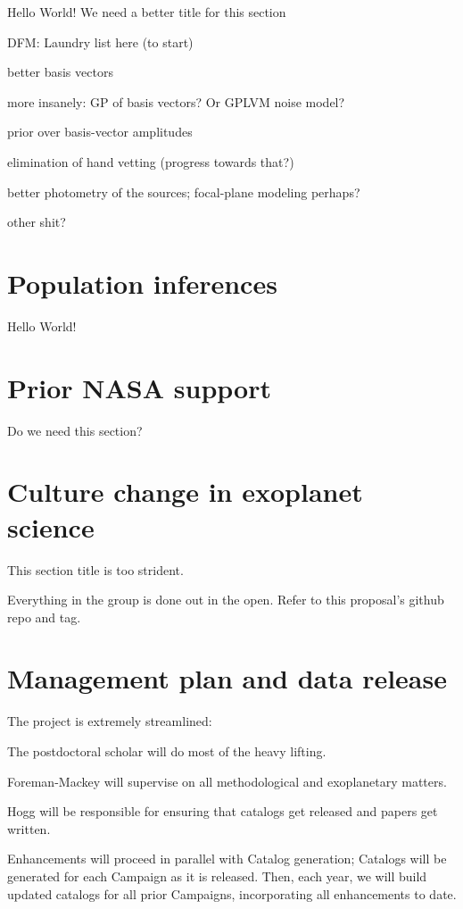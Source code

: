 \documentclass[12pt,preprint]{aastex}
\begin{document}
Hello World!  We need a better title for this section

DFM:  Laundry list here (to start)

better basis vectors

more insanely: GP of basis vectors?  Or GPLVM noise model?

prior over basis-vector amplitudes

elimination of hand vetting (progress towards that?)

better photometry of the sources; focal-plane modeling perhaps?

other shit?

\section{Population inferences}

Hello World!

\section{Prior NASA support}

Do we need this section?

\section{Culture change in exoplanet science}

This section title is too strident.

Everything in the group is done out in the open.
Refer to this proposal's github repo and tag.

\section{Management plan and data release}

The project is extremely streamlined:

The postdoctoral scholar will do most of the heavy lifting.

Foreman-Mackey will supervise on all methodological and exoplanetary
matters.

Hogg will be responsible for ensuring that catalogs get released and
papers get written.

Enhancements will proceed in parallel with Catalog generation;
Catalogs will be generated for each Campaign as it is released.
Then, each year, we will build updated catalogs for all prior
Campaigns, incorporating all enhancements to date.
\end{document}
